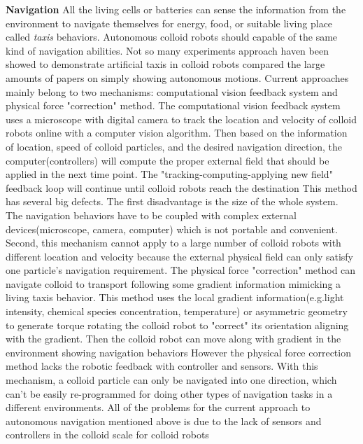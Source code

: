 \textbf{Navigation} All the living cells or batteries can sense the information from the environment to navigate themselves for energy, food, or suitable living place called \textit{taxis} behaviors. Autonomous colloid robots should capable of the same kind of navigation abilities. Not so many experiments approach haven been showed to demonstrate  artificial taxis in colloid robots compared the large amounts of papers on simply showing autonomous motions. Current approaches mainly belong to two mechanisms: computational vision feedback system and physical force "correction" method. The computational vision feedback system uses a microscope with digital camera to track the location and velocity of colloid robots online with a computer vision algorithm. Then based on the information of location, speed of colloid particles, and the desired navigation direction, the computer(controllers) will compute the proper external field that should be applied in the next time point. The "tracking-computing-applying new field" feedback loop will continue until colloid robots reach the destination\cite{li2017autonomous,han2017sequence} This method has several big defects. The first disadvantage is the size of the whole system. The navigation behaviors have to be coupled with complex external devices(microscope, camera, computer) which is not portable and convenient. Second, this mechanism cannot apply to a large number of colloid robots with different location and velocity because the external physical field can only satisfy one particle's navigation requirement. The physical force "correction" method can navigate  colloid to transport following  some gradient information mimicking a living taxis behavior. This method uses the local gradient information(e.g.light intensity, chemical species concentration, temperature) or asymmetric geometry to generate torque rotating  the colloid robot to "correct" its orientation aligning with the gradient. Then the colloid robot can move along with gradient in the environment showing navigation behaviors \cite{brosseau2019relating,ten2014gravitaxis,lozano2016phototaxis,baker2019fight} However the physical force correction method  lacks the robotic feedback with controller and sensors. With this mechanism, a colloid particle can only be navigated into one direction, which can't be easily re-programmed for doing other types of navigation tasks in a different environments. All of the problems for the current approach to autonomous navigation mentioned above is due to the lack of sensors and controllers in the colloid scale for colloid robots





